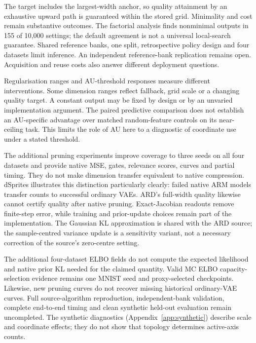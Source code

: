 The target includes the largest-width anchor, so quality attainment by
an exhaustive upward path is guaranteed within the stored grid.
Minimality and cost remain substantive outcomes. The factorial analysis
finds nonminimal outputs in 155 of 10,000 settings; the default agreement
is not a universal local-search guarantee. Shared reference banks, one
split, retrospective policy design and four datasets limit inference.
An independent reference-bank replication remains open. Acquisition
and reuse costs also answer different deployment questions.

Regularisation ranges and AU-threshold responses measure different
interventions. Some dimension ranges reflect fallback, grid scale or a
changing quality target. A constant output may be fixed by design or by
an unvaried implementation argument. The paired predictive comparison
does not establish an AU-specific advantage over matched random-feature
controls on its near-ceiling task. This limits the role of AU here to
a diagnostic of coordinate use under a stated threshold.

The additional pruning experiments improve coverage to three seeds on
all four datasets and provide native MSE, gates, relevance scores,
curves and partial timing. They do not make dimension transfer equivalent
to native compression. dSprites illustrates this distinction particularly
clearly: failed native ARM models transfer counts to successful ordinary
VAEs. ARD's full-width quality likewise cannot certify quality after
native pruning. Exact-Jacobian readouts remove finite-step error, while
training and prior-update choices remain part of the implementation.
The Gaussian KL approximation is shared with the ARD source; the
sample-centred variance update is a sensitivity variant, not a necessary
correction of the source's zero-centre setting.

The additional four-dataset ELBO fields do not compute the expected
likelihood and native prior KL needed for the claimed quantity. Valid
MC ELBO capacity-selection evidence remains one MNIST seed and
proxy-selected checkpoints. Likewise, new pruning curves do not recover
missing historical ordinary-VAE curves. Full source-algorithm reproduction,
independent-bank validation, complete end-to-end timing and clean synthetic
held-out evaluation remain uncompleted. The synthetic diagnostics
(Appendix~\ref{app:synthetic}) describe scale and coordinate effects;
they do not show that topology determines active-axis counts.

